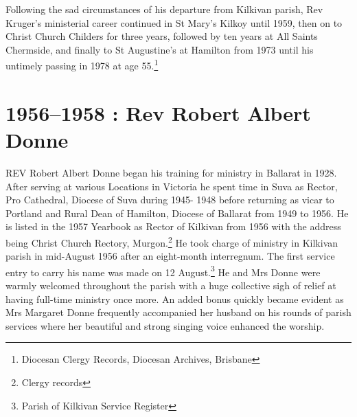 Following the sad circumstances of his departure from Kilkivan parish, Rev Kruger's ministerial career continued in St Mary's Kilkoy until 1959, then on to Christ Church Childers for three years, followed by ten years at All Saints Chermside, and finally to St Augustine's at Hamilton from 1973 until his untimely passing in 1978 at age 55.\footnote{Diocesan Clergy Records, Diocesan Archives, Brisbane}


\balance


\printendnotes[custom]
\setcounter{endnote}{0}
\chapter{1956--1958 : Rev Robert Albert Donne}
\nobalance


\lettrine[lines=3]{R}{EV}
 Robert Albert Donne began his training for ministry in Ballarat in 1928. After serving at various Locations in Victoria he spent time in Suva as Rector, Pro Cathedral, Diocese of Suva during 1945- 1948 before returning as vicar to Portland and Rural Dean of Hamilton, Diocese of Ballarat from 1949 to 1956. He is listed in the 1957 Yearbook as Rector of Kilkivan from 1956 with the address being Christ Church Rectory, Murgon.\footnote{Clergy records} He took charge of ministry in Kilkivan parish in mid-August 1956 after an eight-month interregnum. The first service entry to carry his name was made on 12 August.\footnote{Parish of Kilkivan Service Register} He and Mrs Donne were warmly welcomed throughout the parish with a huge collective sigh of relief at having full-time ministry once more. An added bonus quickly became evident as Mrs Margaret Donne frequently accompanied her husband on his rounds of parish services where her beautiful and strong singing voice enhanced the worship.







